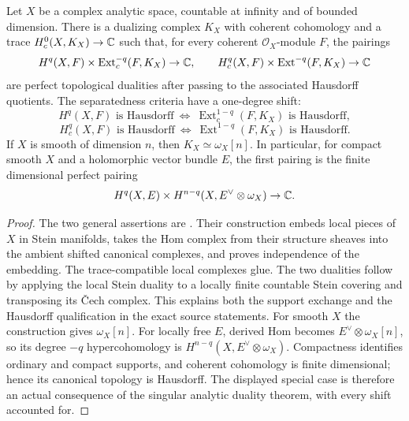 \begin{theorem}\label{thm:B3-analytic-duality}
Let $X$ be a complex analytic space, countable at infinity and of
bounded dimension. There is a dualizing complex $K_X$ with coherent
cohomology and a trace $H_c^0(X,K_X)\to{\ensuremath{\mathbb{C}}}$ such that, for every
coherent $\mathcal O_X$-module $F$, the pairings
\[
 H^q(X,F)\times\operatorname{Ext}^{-q}_c(F,K_X)\to{\ensuremath{\mathbb{C}}},
 \qquad
 H_c^q(X,F)\times\operatorname{Ext}^{-q}(F,K_X)\to{\ensuremath{\mathbb{C}}}
\]
are perfect topological dualities after passing to the associated
Hausdorff quotients. The separatedness criteria have a one-degree
shift:
\[
 H^q(X,F)\text{ is Hausdorff}
 \ \Longleftrightarrow\ 
 \operatorname{Ext}^{1-q}_c(F,K_X)\text{ is Hausdorff},
\]
\[
 H_c^q(X,F)\text{ is Hausdorff}
 \ \Longleftrightarrow\ 
 \operatorname{Ext}^{1-q}(F,K_X)\text{ is Hausdorff}.
\]
If $X$ is smooth of dimension $n$, then
$K_X\simeq\omega_X[n]$. In particular, for compact smooth $X$ and
a holomorphic vector bundle $E$, the first pairing is the finite
dimensional perfect pairing
\[
 H^q(X,E)\times H^{n-q}(X,E^\vee\otimes\omega_X)\to{\ensuremath{\mathbb{C}}}.
\]
\end{theorem}
\begin{proof}
The two general assertions are
\cite[Section 3, Theorem 1, p.~81; Section 4, Theorem 2,
pp.~82--83]{BRamisRuget}. Their construction embeds local pieces of
$X$ in Stein manifolds, takes the Hom complex from their structure
sheaves into the ambient shifted canonical complexes, and proves
independence of the embedding. The trace-compatible local complexes
glue. The two dualities follow by applying the local Stein duality
to a locally finite countable Stein covering and transposing its
\v Cech complex. This explains both the support exchange and the
Hausdorff qualification in the exact source statements.
For smooth $X$ the construction gives $\omega_X[n]$.
For locally free $E$, derived Hom becomes
$E^\vee\otimes\omega_X[n]$, so its degree $-q$ hypercohomology is
$H^{n-q}(X,E^\vee\otimes\omega_X)$. Compactness identifies ordinary
and compact supports, and coherent cohomology is finite dimensional;
hence its canonical topology is Hausdorff. The displayed special
case is therefore an actual consequence of the singular analytic
duality theorem, with every shift accounted for.
\end{proof}

